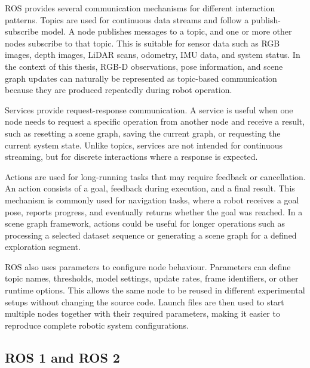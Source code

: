 {\small

ROS provides several communication mechanisms for different interaction patterns. Topics are used for continuous data streams and follow a publish-subscribe model. A node publishes messages to a topic, and one or more other nodes subscribe to that topic. This is suitable for sensor data such as RGB images, depth images, LiDAR scans, odometry, IMU data, and system status. In the context of this thesis, RGB-D observations, pose information, and scene graph updates can naturally be represented as topic-based communication because they are produced repeatedly during robot operation.

Services provide request-response communication. A service is useful when one node needs to request a specific operation from another node and receive a result, such as resetting a scene graph, saving the current graph, or requesting the current system state. Unlike topics, services are not intended for continuous streaming, but for discrete interactions where a response is expected.

Actions are used for long-running tasks that may require feedback or cancellation. An action consists of a goal, feedback during execution, and a final result. This mechanism is commonly used for navigation tasks, where a robot receives a goal pose, reports progress, and eventually returns whether the goal was reached. In a scene graph framework, actions could be useful for longer operations such as processing a selected dataset sequence or generating a scene graph for a defined exploration segment.

ROS also uses parameters to configure node behaviour. Parameters can define topic names, thresholds, model settings, update rates, frame identifiers, or other runtime options. This allows the same node to be reused in different experimental setups without changing the source code. Launch files are then used to start multiple nodes together with their required parameters, making it easier to reproduce complete robotic system configurations.

}

\subsection{ROS 1 and ROS 2}

